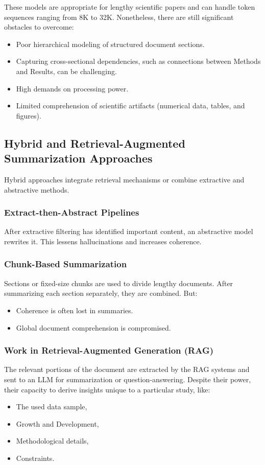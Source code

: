 \documentclass[conference]{IEEEtran}
\begin{document}
These models are appropriate for lengthy scientific papers and can handle token sequences ranging from 8K to 32K. Nonetheless, there are still significant obstacles to overcome: 
\begin{itemize}
    \item Poor hierarchical modeling of structured document sections.
    \item Capturing cross-sectional dependencies, such as connections between Methods and Results, can be challenging.
    \item High demands on processing power.
    \item Limited comprehension of scientific artifacts (numerical data, tables, and figures).
\end{itemize}

\subsection{Hybrid and Retrieval-Augmented Summarization Approaches}
Hybrid approaches integrate retrieval mechanisms or combine extractive and abstractive methods.

\subsubsection{Extract-then-Abstract Pipelines}
After extractive filtering has identified important content, an abstractive model rewrites it. This lessens hallucinations and increases coherence.

\subsubsection{Chunk-Based Summarization}
Sections or fixed-size chunks are used to divide lengthy documents. After summarizing each section separately, they are combined. But:
\begin{itemize}
    \item Coherence is often lost in summaries.
    \item Global document comprehension is compromised.
\end{itemize}

\subsubsection{ Work in Retrieval-Augmented Generation (RAG)}
The relevant portions of the document are extracted by the RAG systems and sent to an LLM for summarization or question-answering. Despite their power, their capacity to derive insights unique to a particular study, like:
\begin{itemize}
    \item The used data sample,
    \item Growth and Development, 
    \item Methodological details,
    \item Constraints.
\end{itemize}
\end{document}
